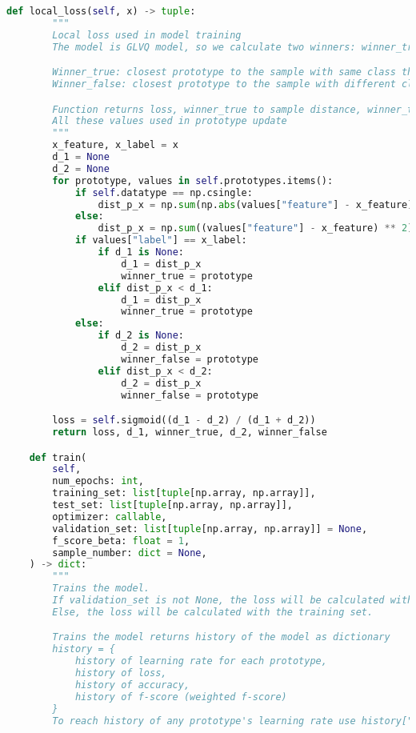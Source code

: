 \begin{lstlisting}[language=Python]
    def local_loss(self, x) -> tuple:
        """
        Local loss used in model training
        The model is GLVQ model, so we calculate two winners: winner_true, winner_false

        Winner_true: closest prototype to the sample with same class than the sample
        Winner_false: closest prototype to the sample with different class than the sample

        Function returns loss, winner_true to sample distance, winner_true, winner_false to sample distance, winner_false as tuple
        All these values used in prototype update
        """
        x_feature, x_label = x
        d_1 = None
        d_2 = None
        for prototype, values in self.prototypes.items():
            if self.datatype == np.csingle:
                dist_p_x = np.sum(np.abs(values["feature"] - x_feature) ** 2)
            else:
                dist_p_x = np.sum((values["feature"] - x_feature) ** 2)
            if values["label"] == x_label:
                if d_1 is None:
                    d_1 = dist_p_x
                    winner_true = prototype
                elif dist_p_x < d_1:
                    d_1 = dist_p_x
                    winner_true = prototype
            else:
                if d_2 is None:
                    d_2 = dist_p_x
                    winner_false = prototype
                elif dist_p_x < d_2:
                    d_2 = dist_p_x
                    winner_false = prototype

        loss = self.sigmoid((d_1 - d_2) / (d_1 + d_2))
        return loss, d_1, winner_true, d_2, winner_false

    def train(
        self,
        num_epochs: int,
        training_set: list[tuple[np.array, np.array]],
        test_set: list[tuple[np.array, np.array]],
        optimizer: callable,
        validation_set: list[tuple[np.array, np.array]] = None,
        f_score_beta: float = 1,
        sample_number: dict = None,
    ) -> dict:
        """
        Trains the model.
        If validation_set is not None, the loss will be calculated with the validation set.
        Else, the loss will be calculated with the training set.

        Trains the model returns history of the model as dictionary
        history = {
            history of learning rate for each prototype,
            history of loss,
            history of accuracy,
            history of f-score (weighted f-score)
        }
        To reach history of any prototype's learning rate use history["lr"][prototype_number]


\end{lstlisting}
